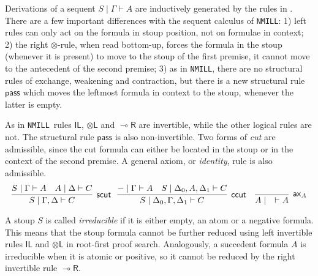 \documentclass[runningheads]{llncs}
\newcommand{\tl}{\otimes \mathsf{L}}
\newcommand{\lright}{{\multimap}\mathsf{R}}
\newcommand{\pass}{\mathsf{pass}}
\newcommand{\unitl}{\mathsf{IL}}
\newcommand{\otL}{\tl}
\newcommand{\lolliR}{\lright}
\newcommand{\IL}{\unitl}
\newcommand{\ax}{\mathsf{ax}}
\newcommand{\ot}{\otimes}
\newcommand{\NMILL}{\texttt{NMILL}}
\begin{document}
Derivations of a sequent $S \mid \Gamma \vdash A$ are inductively generated by the rules in .
There are a few important differences with the sequent calculus of \NMILL:
1) left rules can only act on the formula in stoup position, not on formulae in context; 2) the right $\ot$-rule, when read bottom-up, forces the formula in the stoup (whenever it is present) to move to the stoup of the first premise, it cannot move to the antecedent of the second premise; 3) as in \NMILL, there are no structural rules of exchange, weakening and contraction, but there is a new structural rule $\pass$ which moves the leftmost formula in context to the stoup, whenever the latter is empty.

As in \NMILL\, rules $\IL$, $\otL$ and $\lolliR$ are invertible, while the other logical rules are not. The structural rule $\pass$ is also non-invertible.
Two forms of \emph{cut} are admissible, since the cut formula can either be located in the stoup or in the context of the second premise. A general axiom, or \emph{identity}, rule is also admissible.
\[
    \infer[\mathsf{scut}]{S \mid \Gamma , \Delta \vdash C}{
      S \mid \Gamma \vdash A
      &
      A \mid \Delta \vdash C
    }
    \;\;\,
    \infer[\mathsf{ccut}]{S \mid \Delta_0 , \Gamma , \Delta_1 \vdash C}{
      - \mid \Gamma \vdash A
      &
      S \mid \Delta_0 , A , \Delta_1 \vdash C
    }
    \quad
    \infer[\ax_A]{A \mid \quad \vdash A}{}
\]

A stoup $S$ is called \emph{irreducible} if it is either empty, an atom or a negative formula. This means that the stoup formula cannot be further reduced using left invertible rules $\IL$ and $\otL$ in root-first proof search. Analogously, a succedent formula $A$ is irreducible when it is atomic or positive, so it cannot be reduced by the right invertible rule $\lolliR$.
\end{document}
